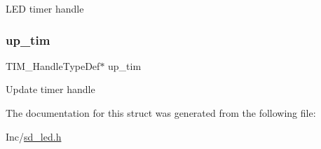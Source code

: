 L\+ED timer handle \mbox{\label{structsd__led_a61d4acd84796eefb3b7dead0fae9dabb}} 
\subsubsection{\texorpdfstring{up\+\_\+tim}{up\_tim}}
{\footnotesize\ttfamily T\+I\+M\+\_\+\+Handle\+Type\+Def$\ast$ up\+\_\+tim}

Update timer handle 

The documentation for this struct was generated from the following file\+:\begin{DoxyCompactItemize}
\item 
Inc/\mbox{\hyperlink{sd__led_8h}{sd\+\_\+led.\+h}}\end{DoxyCompactItemize}
